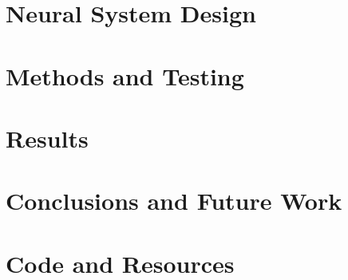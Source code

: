 \documentclass[12pt, letterpaper, oneside, onecolumn]{report} %
\begin{document}
\chapter{Neural System Design}
\label{chap:neuron_design}


\chapter{Methods and Testing}
\label{chap:methods}


\chapter{Results}
\label{chap:results}


\chapter{Conclusions and Future Work}
\label{chap:conclusion}


\newpage
\appendix
{}
\chapter{Code and Resources}
\label{app:resources}


\newpage
\label{chap:references}
\printbibliography[heading=bibintoc, title={Bibliography}]
\end{document}
